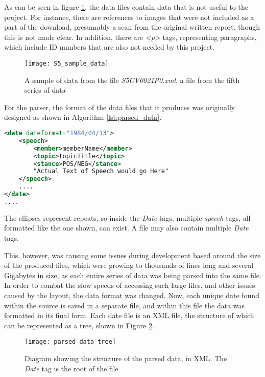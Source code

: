 As can be seen in figure \ref{fig:S5_sample_screenshot}, the data files contain data that is not useful to the project. For instance, there are references to images that were not included as a part of the download, presumably a scan from the original written report, though this is not made clear. In addition, there are \emph{<p>} tags, representing paragraphs, which include ID numbers that are also not needed by this project.

\begin{figure}[ht]
	\texttt{[image: S5\_sample\_data]}
	\caption{A sample of data from the file \emph{S5CV0021P0.xml}, a file from the fifth series of data}
	\label{fig:S5_sample_screenshot}
\end{figure}
For the parser, the format of the data files that it produces was originally designed as shown in Algorithm \ref{lst:parsed_data}.
\begin{lstlisting}[language=XML,
				   float=ht,
				   caption={Earlier version of the Parsed Data design},
				   label={lst:parsed_data}]
<date dateformat="1984/04/13">	
    <speech>
        <member>memberName</member>
        <topic>topicTitle</topic>
        <stance>POS/NEG</stance>
        "Actual Text of Speech would go Here"
    </speech>
    ....
</date>
....
\end{lstlisting}
The ellipses represent repeats, so inside the \emph{Date} tags, multiple \emph{speech} tags, all formatted like the one shown, can exist. A file may also contain multiple \emph{Date} tags. 

This, however, was causing some issues during development based around the size of the produced files, which were growing to thousands of lines long and several Gigabytes in size, as each entire series of data was being parsed into the same file. In order to combat the slow speeds of accessing such large files, and other issues caused by the layout, the data format was changed. Now, each unique date found within the source is saved in a separate file, and within this file the data was formatted in its final form.
Each date file is an XML file, the structure of which can be represented as a tree, shown in Figure \ref{fig:parsed_data_tree}.

\begin{figure}[ht]
	\texttt{[image: parsed\_data\_tree]}
	\caption{Diagram showing the structure of the parsed data, in XML. The \emph{Date} tag is the root of the file}
	\label{fig:parsed_data_tree}
\end{figure}

